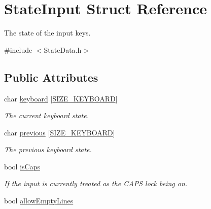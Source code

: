 \hypertarget{struct_state_input}{\section{State\-Input Struct Reference}
\label{struct_state_input}
}


The state of the input keys.  




{\ttfamily \#include $<$State\-Data.\-h$>$}

\subsection*{Public Attributes}
\begin{DoxyCompactItemize}
\item 
\hypertarget{struct_state_input_a48ab250bd3e991a9de2c5ddb25f825e4}{char \hyperlink{struct_state_input_a48ab250bd3e991a9de2c5ddb25f825e4}{keyboard} \mbox{[}\hyperlink{struct_state_input_acc91adb5a30e828f5fd4be0228a09040}{S\-I\-Z\-E\-\_\-\-K\-E\-Y\-B\-O\-A\-R\-D}\mbox{]}}\label{struct_state_input_a48ab250bd3e991a9de2c5ddb25f825e4}

\begin{DoxyCompactList}\small\item\em The current keyboard state. \end{DoxyCompactList}\item 
\hypertarget{struct_state_input_a711e607cf2c158c933b80bfc8caa036a}{char \hyperlink{struct_state_input_a711e607cf2c158c933b80bfc8caa036a}{previous} \mbox{[}\hyperlink{struct_state_input_acc91adb5a30e828f5fd4be0228a09040}{S\-I\-Z\-E\-\_\-\-K\-E\-Y\-B\-O\-A\-R\-D}\mbox{]}}\label{struct_state_input_a711e607cf2c158c933b80bfc8caa036a}

\begin{DoxyCompactList}\small\item\em The previous keyboard state. \end{DoxyCompactList}\item 
\hypertarget{struct_state_input_a74ffea978c21525eef29d3612f8ab88f}{bool \hyperlink{struct_state_input_a74ffea978c21525eef29d3612f8ab88f}{is\-Caps}}\label{struct_state_input_a74ffea978c21525eef29d3612f8ab88f}

\begin{DoxyCompactList}\small\item\em If the input is currently treated as the C\-A\-P\-S lock being on. \end{DoxyCompactList}\item 
\hypertarget{struct_state_input_a144b051f8d304e3fb9f8d69e4fddaa5d}{bool \hyperlink{struct_state_input_a144b051f8d304e3fb9f8d69e4fddaa5d}{allow\-Empty\-Lines}}\label{struct_state_input_a144b051f8d304e3fb9f8d69e4fddaa5d}


\end{DoxyCompactItemize}
